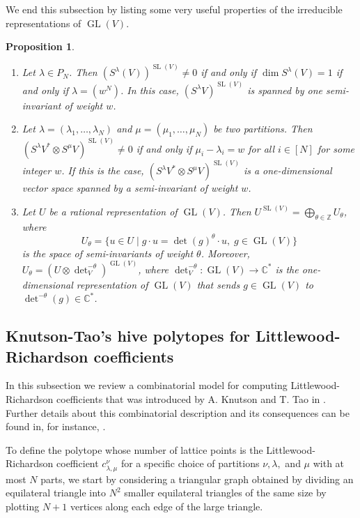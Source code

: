 \documentclass[11pt]{article}
\newtheorem{prop}[theo]{Proposition}
\theoremstyle{definition}
\numberwithin{equation}{section}
\newcommand{\SL}{\operatorname{SL}}
\newcommand{\GL}{\operatorname{GL}}
\newcommand{\ZZ}{\mathbb Z}
\newcommand{\CC}{\mathbb C}
\begin{document}
We end this subsection by listing some very useful properties of the irreducible representations of $\GL(V)$. 

\begin{prop}\ \label{irr-gln-prop}
\begin{enumerate}
\item \hypertarget{irr-gln-prop-1}{} Let $\lambda \in P_N$. Then $\left(S^\lambda(V)\right)^{\SL(V)} \neq 0$ if and only if $\dim S^\lambda (V) = 1$ if and only if $\lambda = (w^N)$. In this case, $\left(S^\lambda V\right)^{\SL(V)}$ is spanned by one semi-invariant of weight $w$.
\item  \hypertarget{irr-gln-prop-2}{}  Let $\lambda = (\lambda_1,\ldots, \lambda_N)$ and $\mu = (\mu_1,\ldots, \mu_N)$ be two partitions. Then $\left(S^\lambda V^* \otimes S^\mu V\right)^{\SL(V)} \neq 0$ if and only if $\mu_i-\lambda_i=w$ for all $i \in [N]$ for some integer $w$. If this is the case, $\left(S^\lambda V^* \otimes S^\mu V\right)^{\SL(V)}$ is a one-dimensional vector space spanned by a semi-invariant of weight $w$.
\item \hypertarget{irr-gln-prop-3}{}  Let $U$ be a rational representation of $\GL(V)$. Then $U^{\SL(V)} = \bigoplus_{\theta \in \ZZ} U_\theta$, where
\[
U_\theta = \{u \in U \mid g \cdot u = \det(g)^\theta \cdot u, \; g \in \GL(V)\}
\]
is the space of semi-invariants of weight $\theta$. Moreover, $U_\theta = \left(U \otimes \det^{-\theta}_V\right)^{\GL(V)}$, where $\det^{-\theta}_V : \GL(V) \to \CC^*$ is the one-dimensional representation of $\GL(V)$ that sends $g \in \GL(V)$ to $\det^{-\theta}(g) \in \CC^*$.
\end{enumerate}
\end{prop}
	
\subsection{Knutson-Tao's hive polytopes for Littlewood-Richardson coefficients}
\label{subsection:hives}
In this subsection we review a combinatorial model for computing Littlewood-Richardson coefficients that was introduced by A. Knutson and T. Tao in \cite{KT, KT2}. Further details about this combinatorial description and its consequences can be found in, for instance, \cite{KTT, KTT2, KTT3, KTT4}.

To define the polytope whose number of lattice points is the Littlewood-Richardson coefficient $c^\nu_{\lambda,\mu}$ for a specific choice of partitions $\nu,\lambda,$ and $\mu$ with at most $N$ parts, we start by considering a triangular graph obtained by dividing an equilateral triangle into $N^2$ smaller equilateral triangles of the same size by plotting $N+1$ vertices along each edge of the large triangle.  
\end{document}
